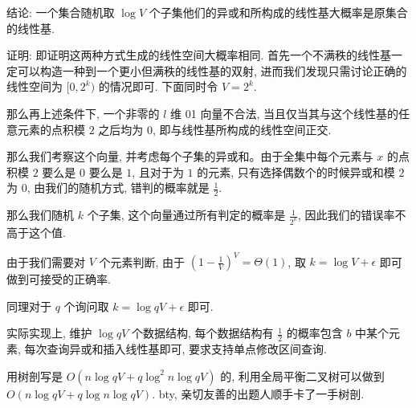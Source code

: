 \documentclass[a4paper, 12pt]{ctexart}
\begin{document}
结论: 一个集合随机取 $\log V$ 个子集他们的异或和所构成的线性基大概率是原集合的线性基.

证明: 即证明这两种方式生成的线性空间大概率相同. 首先一个不满秩的线性基一定可以构造一种到一个更小但满秩的线性基的双射, 进而我们发现只需讨论正确的线性空间为 $[0, 2^k)$ 的情况即可. 下面同时令 $V = 2^k$.

那么再上述条件下, 一个非零的 $l$ 维 01 向量不合法, 当且仅当其与这个线性基的任意元素的点积模 $2$ 之后均为 $0$, 即与线性基所构成的线性空间正交.

那么我们考察这个向量, 并考虑每个子集的异或和。由于全集中每个元素与 $x$ 的点积模 $2$ 要么是 $0$ 要么是 $1$, 且对于为 $1$ 的元素, 只有选择偶数个的时候异或和模 $2$ 为 $0$, 由我们的随机方式, 错判的概率就是 $\frac{1}{2}$.

那么我们随机 $k$ 个子集, 这个向量通过所有判定的概率是 $\frac{1}{2^k}$, 因此我们的错误率不高于这个值.

由于我们需要对 $V$ 个元素判断, 由于 ${(1 - \frac{1}{V})}^V = \Theta(1)$, 取 $k=\log V+\epsilon$ 即可做到可接受的正确率.

同理对于 $q$ 个询问取 $k=\log qV+\epsilon$ 即可.

实际实现上, 维护 $\log qV$ 个数据结构, 每个数据结构有 $\frac{1}{2}$ 的概率包含 $b$ 中某个元素, 每次查询异或和插入线性基即可, 要求支持单点修改区间查询.

用树剖写是 $O(n \log qV + q \log^2 n \log qV)$ 的, 利用全局平衡二叉树可以做到 $O(n \log qV + q \log n \log qV)$. bty, 亲切友善的出题人顺手卡了一手树剖.
\end{document}

